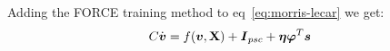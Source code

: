 \documentclass[12pt, letter]{article}
\begin{document}
	Adding the FORCE training method to eq~\ref{eq:morris-lecar} we get:
	\begin{equation}
		\begin{aligned}
			C\dot{\vb*{v}} &= f(\vb*{v}, \vb{X}) + \vb*{I}_{psc} + \vb*{\eta} \vb*{\varphi}^T \vb*{s}
		\end{aligned}
	\end{equation}
	
\end{document}
